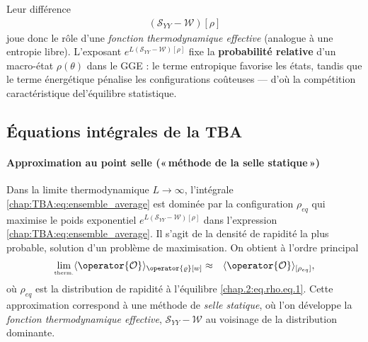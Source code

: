 \medskip

Leur différence
\begin{eqnarray}
	(\mathcal{S}_{YY}-\mathcal{W})[\rho]	
\end{eqnarray}
joue donc le rôle d’une \emph{fonction thermodynamique effective}
(analogue à une entropie libre).  
L’exposant $e^{L(\mathcal{S}_{YY}-\mathcal{W})[\rho]}$ fixe la \textbf{probabilité relative} d’un macro-état $\rho(\theta)$ dans le GGE : le terme entropique favorise les états, tandis que le terme énergétique pénalise les configurations coûteuses — d’où la compétition caractéristique del’équilibre statistique.






%
\subsection{Équations intégrales de la TBA}


\paragraph{Approximation au point selle («\,méthode de la selle statique\,»)}

Dans la limite thermodynamique \( L \to \infty \), l'intégrale \eqref{chap:TBA:eq:ensemble_average} est dominée par la configuration \( \rho_{eq} \) qui maximise le poids exponentiel $e^{L(\mathcal{S}_{YY}-\mathcal{W})[\rho]}$  dans l'expression \eqref{chap:TBA:eq:ensemble_average}. Il s’agit de la densité de rapidité la plus probable, solution d’un problème de maximisation. On obtient à l’ordre principal
\begin{eqnarray}
	\underset{\mbox{\tiny therm.}}{\lim} \langle \operator{\mathcal{O}} \rangle_{\operator{\varrho}[w]} & \approx &  \langle\operator{\mathcal{O}}\rangle_{[\rho_{eq} ]},	
	\label{chap:TBA:eq:ensemble_average:approx}
\end{eqnarray}
où $\rho_{eq}$ est la distribution de rapidité à l'équilibre \eqref{chap.2:eq.rho.eq.1}.
Cette approximation correspond à une méthode de \textit{selle statique}, où l’on développe la \emph{fonction thermodynamique effective}, $\mathcal{S}_{YY}-\mathcal{W}$  au voisinage de la distribution dominante.

